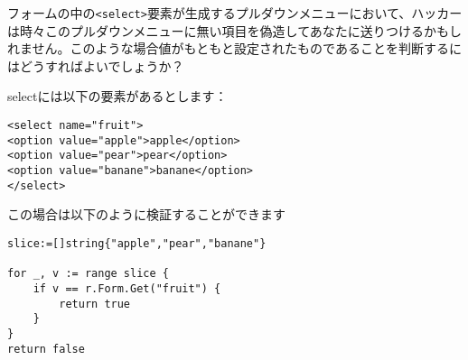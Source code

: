 フォームの中の\texttt{<select>}要素が生成するプルダウンメニューにおいて、ハッカーは時々このプルダウンメニューに無い項目を偽造してあなたに送りつけるかもしれません。このような場合値がもともと設定されたものであることを判断するにはどうすればよいでしょうか？

selectには以下の要素があるとします：


\begin{lstlisting}[numbers=none]
<select name="fruit">
<option value="apple">apple</option>
<option value="pear">pear</option>
<option value="banane">banane</option>
</select>
\end{lstlisting}

この場合は以下のように検証することができます

\begin{lstlisting}[numbers=none]
slice:=[]string{"apple","pear","banane"}

for _, v := range slice {
    if v == r.Form.Get("fruit") {
        return true
    }
}
return false
\end{lstlisting}

